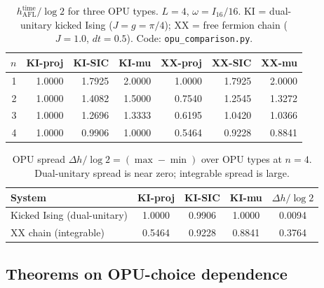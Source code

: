 \documentclass[12pt,a4paper]{article}
\begin{document}
\begin{table}[h!]
\centering
\caption{$h_{\mathrm{AFL}}^{\mathrm{time}}/\log 2$ for three OPU types.
$L=4$, $\omega = I_{16}/16$.  KI = dual-unitary kicked Ising ($J=g=\pi/4$);
XX = free fermion chain ($J=1.0$, $dt=0.5$).  Code: \texttt{opu\_comparison.py}.}
\label{tab:opu_comparison}
\begin{tabular}{r|rrr|rrr}
\hline
$n$ & KI-proj & KI-SIC & KI-mu & XX-proj & XX-SIC & XX-mu \\
\hline
1 & 1.0000 & 1.7925 & 2.0000 & 1.0000 & 1.7925 & 2.0000 \\
2 & 1.0000 & 1.4082 & 1.5000 & 0.7540 & 1.2545 & 1.3272 \\
3 & 1.0000 & 1.2696 & 1.3333 & 0.6195 & 1.0420 & 1.0366 \\
4 & 1.0000 & 0.9906 & 1.0000 & 0.5464 & 0.9228 & 0.8841 \\
\hline
\end{tabular}
\end{table}

\begin{table}[h!]
\centering
\caption{OPU spread $\Delta h/\log 2 = (\max - \min)$ over OPU types at $n=4$.
Dual-unitary spread is near zero; integrable spread is large.}
\label{tab:opu_spread}
\begin{tabular}{lcccc}
\hline
System & KI-proj & KI-SIC & KI-mu & $\Delta h/\log 2$ \\
\hline
Kicked Ising (dual-unitary) & 1.0000 & 0.9906 & 1.0000 & 0.0094 \\
XX chain (integrable)       & 0.5464 & 0.9228 & 0.8841 & 0.3764 \\
\hline
\end{tabular}
\end{table}

\subsection{Theorems on OPU-choice dependence}
\end{document}
